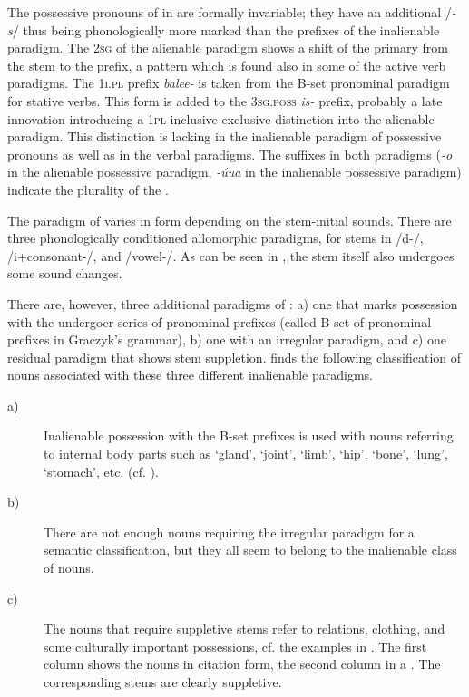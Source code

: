 \documentclass[output=paper]{LSP/langsci}
\begin{document}
The possessive pronouns of  in  are formally invariable; they have an additional /\textit{-s}/ thus being phonologically more marked than the prefixes of the inalienable paradigm. The \textsc{2sg}  of the alienable paradigm shows a shift of the primary  from the stem to the prefix, a pattern which is found also in some of the active verb paradigms. The \textsc{1i.pl} prefix \textit{balee-} is taken from the B-set pronominal paradigm for stative verbs. This form is added to the \textsc{3sg.poss} \textit{is-} prefix, probably a late innovation introducing a \textsc{1pl} inclusive-exclusive distinction into the alienable paradigm. This distinction is lacking in the inalienable paradigm of possessive pronouns as well as in the verbal paradigms. The suffixes in both paradigms (\textit{-o} in the alienable possessive paradigm, \textit{-úua} in the inalienable possessive paradigm) indicate the plurality of the .

The paradigm of  varies in form depending on the stem-initial sounds. There are three phonologically conditioned allomorphic paradigms, for stems in /d-/, /i+consonant-/, and /vowel-/. As can be seen in , the stem itself also undergoes some sound changes.

There are, however, three additional paradigms of : a) one that marks possession with the undergoer series of pronominal prefixes (called B-set of pronominal prefixes in Graczyk's grammar), b) one with an irregular paradigm, and c) one residual paradigm that shows stem suppletion. \citet[57]{Graczyk2007} finds the following classification of nouns associated with these three different inalienable paradigms.

\begin{description}
\item[a)] Inalienable possession with the B-set prefixes is used with nouns referring to internal body parts such as `gland', `joint', `limb', `hip', `bone', `lung', `stomach', etc. (cf. \citealt[57]{Graczyk2007}).

\item[b)] There are not enough nouns requiring the irregular paradigm for a semantic classification, but they all seem to belong to the inalienable class of nouns.

\item[c)] The nouns that require suppletive stems refer to  relations, clothing, and some culturally important possessions, cf. the examples in . The first column shows the nouns in citation form, the second column in a . The corresponding stems are clearly suppletive. 
\end{description}
\end{document}
